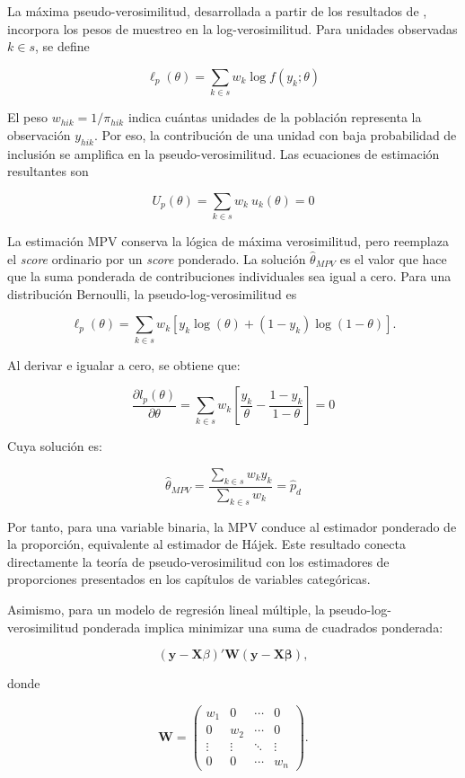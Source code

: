 \documentclass[
  spanish,
  12pt,
]{book}
\begin{document}
La máxima pseudo-verosimilitud, desarrollada a partir de los resultados de \citet{binder1983variances}, incorpora los pesos de muestreo en la log-verosimilitud. Para unidades observadas \(k \in s\), se define

\[
\ell_p(\theta)
= \sum_{k \in s} w_k \log f(y_k;\theta)
\]

El peso \(w_{hik}=1/\pi_{hik}\) indica cuántas unidades de la población representa la observación \(y_{hik}\). Por eso, la contribución de una unidad con baja probabilidad de inclusión se amplifica en la pseudo-verosimilitud. Las ecuaciones de estimación resultantes son

\[
U_p(\theta)
= \sum_{k \in s} w_k \ u_k(\theta)
= 0
\]

La estimación MPV conserva la lógica de máxima verosimilitud, pero reemplaza el \emph{score} ordinario por un \emph{score} ponderado. La solución \(\hat{\theta}_{MPV}\) es el valor que hace que la suma ponderada de contribuciones individuales sea igual a cero. Para una distribución Bernoulli, la pseudo-log-verosimilitud es

\[
\ell_p(\theta)
= \sum_{k \in s} w_k
\left[
y_k\log(\theta)
+(1-y_k)\log(1-\theta)
\right].
\]

Al derivar e igualar a cero, se obtiene que:

\[
\frac{\partial l_p(\theta)}{\partial \theta}
=
\sum_{k \in s} w_k
\left[
\frac{y_k}{\theta}
-\frac{1-y_k}{1-\theta}
\right]
=0
\]

Cuya solución es:

\[
\hat{\theta}_{MPV}
=
\frac{\sum_{k \in s}w_k y_k}
     {\sum_{k \in s}w_k}
= \hat{p}_d
\]

Por tanto, para una variable binaria, la MPV conduce al estimador ponderado de la proporción, equivalente al estimador de Hájek. Este resultado conecta directamente la teoría de pseudo-verosimilitud con los estimadores de proporciones presentados en los capítulos de variables categóricas.

Asimismo, para un modelo de regresión lineal múltiple, la pseudo-log-verosimilitud ponderada implica minimizar una suma de cuadrados ponderada:

\[
(\mathbf{y}-\mathbf{X}\beta)'\mathbf{W}(\mathbf{y}-\mathbf{X}\boldsymbol{\beta}),
\]

donde

\[
\mathbf{W}=
\begin{pmatrix}
w_1 & 0 & \cdots & 0\\
0 & w_2 & \cdots & 0\\
\vdots & \vdots & \ddots & \vdots\\
0 & 0 & \cdots & w_n
\end{pmatrix}.
\]
\end{document}
